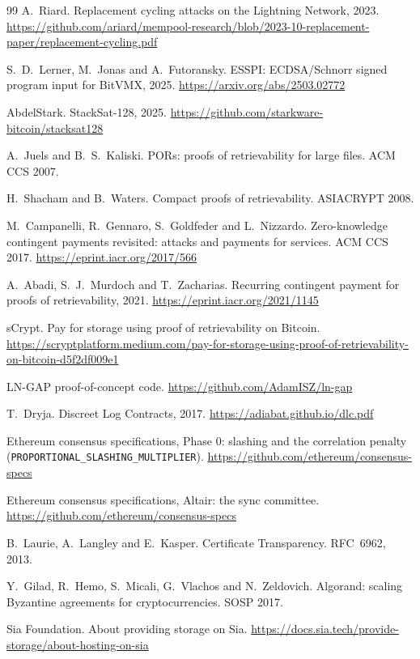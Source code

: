 \documentclass[11pt]{article}
\begin{document}
\begin{thebibliography}{99}
 A.~Riard. Replacement cycling attacks on the Lightning Network, 2023. \url{https://github.com/ariard/mempool-research/blob/2023-10-replacement-paper/replacement-cycling.pdf}

 S.~D.~Lerner, M.~Jonas and A.~Futoransky. ESSPI: ECDSA/Schnorr signed program input for BitVMX, 2025. \url{https://arxiv.org/abs/2503.02772}

 AbdelStark. StackSat-128, 2025. \url{https://github.com/starkware-bitcoin/stacksat128}

 A.~Juels and B.~S.~Kaliski. PORs: proofs of retrievability for large files. ACM CCS 2007.

 H.~Shacham and B.~Waters. Compact proofs of retrievability. ASIACRYPT 2008.

 M.~Campanelli, R.~Gennaro, S.~Goldfeder and L.~Nizzardo. Zero-knowledge contingent payments revisited: attacks and payments for services. ACM CCS 2017. \url{https://eprint.iacr.org/2017/566}

 A.~Abadi, S.~J.~Murdoch and T.~Zacharias. Recurring contingent payment for proofs of retrievability, 2021. \url{https://eprint.iacr.org/2021/1145}

 sCrypt. Pay for storage using proof of retrievability on Bitcoin. \url{https://scryptplatform.medium.com/pay-for-storage-using-proof-of-retrievability-on-bitcoin-d5f2df009e1}

 LN-GAP proof-of-concept code. \url{https://github.com/AdamISZ/ln-gap}

 T.~Dryja. Discreet Log Contracts, 2017. \url{https://adiabat.github.io/dlc.pdf}

 Ethereum consensus specifications, Phase 0: slashing and the correlation penalty (\texttt{PROPORTIONAL\_SLASHING\_MULTIPLIER}). \url{https://github.com/ethereum/consensus-specs}

 Ethereum consensus specifications, Altair: the sync committee. \url{https://github.com/ethereum/consensus-specs}

 B.~Laurie, A.~Langley and E.~Kasper. Certificate Transparency. RFC~6962, 2013.

 Y.~Gilad, R.~Hemo, S.~Micali, G.~Vlachos and N.~Zeldovich. Algorand: scaling Byzantine agreements for cryptocurrencies. SOSP 2017.

 Sia Foundation. About providing storage on Sia. \url{https://docs.sia.tech/provide-storage/about-hosting-on-sia}


\end{thebibliography}
\end{document}
